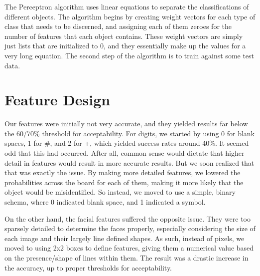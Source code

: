 \documentclass{article}
\begin{document}
The Perceptron algorithm uses linear equations to separate the classifications of different objects. The algorithm begins by creating weight vectors for each type of class that needs to be discerned, and assigning each of them zeroes for the number of features that each object contains. These weight vectors are simply just lists that are initialized to 0, and they essentially make up the values for a very long equation. The second step of the algorithm is to train against some test data.
\section{Feature Design}
Our features were initially not very accurate, and they yielded results far below the 60/70\% threshold for acceptability. For digits, we started by using 0 for blank spaces, 1 for \#, and 2 for +, which yielded success rates around 40\%. It seemed odd that this had occurred. After all, common sense would dictate that higher detail in features would result in more accurate results. But we soon realized that that was exactly the issue. By making more detailed features, we lowered the probabilities across the board for each of them, making it more likely that the object would be misidentified. So instead, we moved to use a simple, binary schema, where 0 indicated blank space, and 1 indicated a symbol.
\par
On the other hand, the facial features suffered the opposite issue. They were too sparsely detailed to determine the faces properly, especially considering the size of each image and their largely line defined shapes. As such, instead of pixels, we moved to using 2x2 boxes to define features, giving them a numerical value based on the presence/shape of lines within them. The result was a drastic increase in the accuracy, up to proper thresholds for acceptability.
\end{document}
